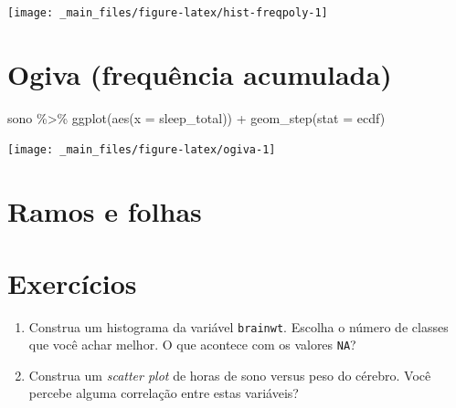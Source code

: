 \documentclass[
  11pt]{report}
\newenvironment{Shaded}{\begin{snugshade}}{\end{snugshade}}
\newcommand{\AttributeTok}[1]{\textcolor[rgb]{0.77,0.63,0.00}{#1}}
\newcommand{\DocumentationTok}[1]{\textcolor[rgb]{0.56,0.35,0.01}{\textbf{\textit{#1}}}}
\newcommand{\FunctionTok}[1]{\textcolor[rgb]{0.00,0.00,0.00}{#1}}
\newcommand{\NormalTok}[1]{#1}
\newcommand{\SpecialCharTok}[1]{\textcolor[rgb]{0.00,0.00,0.00}{#1}}
\newcommand{\StringTok}[1]{\textcolor[rgb]{0.31,0.60,0.02}{#1}}
\begin{document}
\begin{center}\texttt{[image: \_main\_files/figure-latex/hist-freqpoly-1]} \end{center}

\hypertarget{ogiva-frequuxeancia-acumulada}{%
\section{Ogiva (frequência acumulada)}\label{ogiva-frequuxeancia-acumulada}}

\begin{Shaded}
\begin{Highlighting}[]
\NormalTok{sono }\SpecialCharTok{\%\textgreater{}\%} 
  \FunctionTok{ggplot}\NormalTok{(}\FunctionTok{aes}\NormalTok{(}\AttributeTok{x =}\NormalTok{ sleep\_total)) }\SpecialCharTok{+}
  \FunctionTok{geom\_step}\NormalTok{(}\AttributeTok{stat =} \StringTok{\textquotesingle{}ecdf\textquotesingle{}}\NormalTok{)}
\end{Highlighting}
\end{Shaded}

\begin{center}\texttt{[image: \_main\_files/figure-latex/ogiva-1]} \end{center}

\hypertarget{ramos-e-folhas}{%
\section{Ramos e folhas}\label{ramos-e-folhas}}

\begin{Shaded}
\end{Shaded}

\hypertarget{exercuxedcios-3}{%
\section{Exercícios}\label{exercuxedcios-3}}

\begin{enumerate}
\def\labelenumi{\arabic{enumi}.}
\item
  Construa um histograma da variável \texttt{brainwt}. Escolha o número de classes que você achar melhor. O que acontece com os valores \texttt{NA}?
\item
  Construa um \emph{scatter plot} de horas de sono versus peso do cérebro. Você percebe alguma correlação entre estas variáveis?
\end{enumerate}
\end{document}
